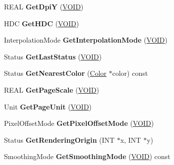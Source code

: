 \begin{DoxyCompactItemize}
\item 
\mbox{\label{class_graphics_a95f4dc2eb00216cec4f152e9c197368e}} 
R\+E\+AL {\bfseries Get\+DpiY} (\hyperlink{interfacevoid}{V\+O\+ID})
\item 
\mbox{\label{class_graphics_aa01ae31a1cbb99bc394570ac77728058}} 
H\+DC {\bfseries Get\+H\+DC} (\hyperlink{interfacevoid}{V\+O\+ID})
\item 
\mbox{\label{class_graphics_a50755568f639af88a52085563734bd8a}} 
Interpolation\+Mode {\bfseries Get\+Interpolation\+Mode} (\hyperlink{interfacevoid}{V\+O\+ID})
\item 
\mbox{\label{class_graphics_afebf8c47325ef58f3d896065241be504}} 
Status {\bfseries Get\+Last\+Status} (\hyperlink{interfacevoid}{V\+O\+ID})
\item 
\mbox{\label{class_graphics_a2e57eca68f61f2e0bdb38d199d32bb8d}} 
Status {\bfseries Get\+Nearest\+Color} (\hyperlink{struct_color}{Color} $\ast$color) const
\item 
\mbox{\label{class_graphics_a50970bd0dc41edc2dd56a79ad94db7f2}} 
R\+E\+AL {\bfseries Get\+Page\+Scale} (\hyperlink{interfacevoid}{V\+O\+ID})
\item 
\mbox{\label{class_graphics_a8e1ae4657b0557b96de9fd29bf1fbe23}} 
Unit {\bfseries Get\+Page\+Unit} (\hyperlink{interfacevoid}{V\+O\+ID})
\item 
\mbox{\label{class_graphics_a386ffd3f1c0faa83b35f53a73409236b}} 
Pixel\+Offset\+Mode {\bfseries Get\+Pixel\+Offset\+Mode} (\hyperlink{interfacevoid}{V\+O\+ID})
\item 
\mbox{\label{class_graphics_a758556be686264f83b9c4e0ef75972fa}} 
Status {\bfseries Get\+Rendering\+Origin} (I\+NT $\ast$x, I\+NT $\ast$y)
\item 
\mbox{\label{class_graphics_a6a16ed28f63194c08cdd9a807f669c5b}} 
Smoothing\+Mode {\bfseries Get\+Smoothing\+Mode} (\hyperlink{interfacevoid}{V\+O\+ID}) const
\item 
\mbox{\label{class_graphics_a6df72f1714c23027c0c59d93057e4c7d}} 

\end{DoxyCompactItemize}
